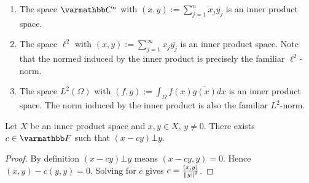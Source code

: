 \begin{example}
\phantom{a}
\begin{enumerate}[label = (\arabic*),itemsep=1pt,topsep=3pt]
    \item The space $\bfC^n$ with $(x,y):= \sum_{j = 1}^n x_j \overline{y_j}$ is an inner product space. 
    \item The space $\ell^2$ with $(x,y) := \sum_{j = 1}^\infty x_j \overline{y_j}$ is an inner product space. Note that the normed induced by the inner product is precisely the familiar $\ell^2$-norm.
    \item The space $L^2(\Omega)$ with $(f,g):= \int_{\Omega}f(x)\overline{g(x)}dx$ is an inner product space. The norm induced by the inner product is also the familiar $L^2$-norm.
\end{enumerate}
\end{example}

\begin{proposition}\label{prop:ips-scaling-factor}
    Let $X$ be an inner product space and $x,y \in X$, $y \neq 0$. There exists $c \in \bfF$ such that $(x-cy) \bot y$.
\end{proposition}
    \begin{proof}
        By definition $(x-cy) \bot y$ means $(x-cy, y) = 0$. Hence $(x,y) - c(y,y) = 0$. Solving for $c$ gives $c = \frac{(x,y)}{\left\lVert y \right\rVert^2}$.
    \end{proof}

